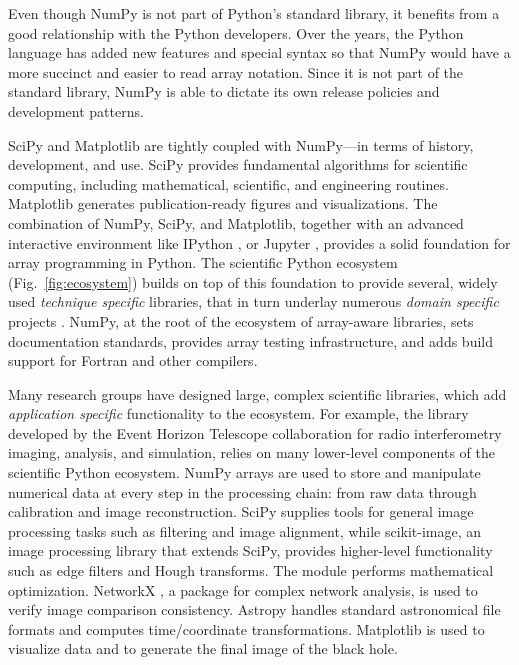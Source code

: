 Even though NumPy is not part of Python's standard library,
it benefits from a good relationship with the Python developers.
Over the years, the Python language has added new features and
special syntax so that NumPy would have a more succinct and 
easier to read array notation.
Since it is not part of the standard library, NumPy is able to
dictate its own release policies and development patterns.

SciPy and Matplotlib are tightly coupled with NumPy---in terms of
history, development, and use.
SciPy provides fundamental algorithms for scientific computing,
including mathematical, scientific, and engineering routines.
Matplotlib generates publication-ready figures and visualizations.
The combination of NumPy, SciPy, and Matplotlib, together with
an advanced interactive environment like IPython \cite{perez2007ipython},
or Jupyter \cite{Kluyver:2016aa}, provides a solid foundation for array
programming in Python.
The scientific Python ecosystem (Fig.~\ref{fig:ecosystem}) builds on top of
this foundation to provide several, widely used \emph{technique specific}
libraries\cite{pedregosa2011scikit,vanderwalt2014scikit,SciPyProceedings_11},
that in turn underlay numerous \emph{domain specific} projects
\cite{astropy:2013,astropy:2018,cock2009biopython,millman2007analysis,sunpy2015,2018EGUGA..2012146H}.
NumPy, at the root of the ecosystem of array-aware libraries,
sets documentation standards, provides array testing infrastructure,
and adds build support for Fortran and other compilers.

Many research groups have designed large,
complex scientific libraries, which add \emph{application specific} functionality
to the ecosystem.
For example, the  library \cite{chael2019ehtim} developed by
the Event Horizon Telescope collaboration for radio interferometry imaging,
analysis, and simulation, relies on many lower-level components of the scientific Python
ecosystem.
NumPy arrays are used to store and manipulate numerical data at every step
in the processing chain: from raw data through calibration and image
reconstruction.
SciPy supplies tools for general image processing tasks such as
filtering and image alignment, while scikit-image, an image processing
library that extends SciPy, provides higher-level functionality such as
edge filters and Hough transforms.
The  module performs mathematical optimization.
NetworkX \cite{SciPyProceedings_11}, a package for complex
network analysis, is used to verify image comparison consistency.
Astropy \cite{astropy:2013, astropy:2018} handles standard
astronomical file formats and computes time/coordinate transformations.
Matplotlib is used to visualize data and to generate the final image of the black hole.

